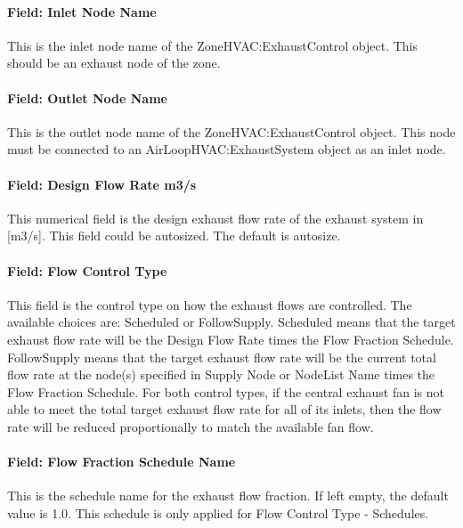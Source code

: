\paragraph{Field: Inlet Node Name}

This is the inlet node name of the ZoneHVAC:ExhaustControl object. This should be an exhaust node of the zone.

\paragraph{Field: Outlet Node Name}

This is the outlet node name of the ZoneHVAC:ExhaustControl object. This node must be connected to an AirLoopHVAC:ExhaustSystem object as an inlet node.

\paragraph{Field: Design Flow Rate {m3/s}}

This numerical field is the design exhaust flow rate of the exhaust system in [m3/s]. This field could be autosized. The default is autosize.

\paragraph{Field: Flow Control Type}

This field is the control type on how the exhaust flows are controlled. The available choices are: Scheduled or FollowSupply. Scheduled means that the target exhaust flow rate will be the Design Flow Rate times the Flow Fraction Schedule. FollowSupply means that the target exhaust flow rate will be the current total flow rate at the node(s) specified in Supply Node or NodeList Name times the Flow Fraction Schedule. For both control types, if the central exhaust fan is not able to meet the total target exhaust flow rate for all of its inlets, then the flow rate will be reduced proportionally to match the available fan flow.

\paragraph{Field: Flow Fraction Schedule Name}

This is the schedule name for the exhaust flow fraction. If left empty, the default value is 1.0. This schedule is only applied for Flow Control Type - Schedules.

